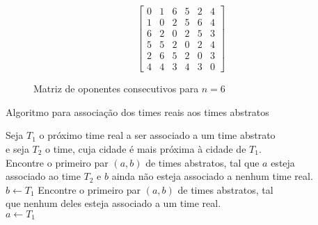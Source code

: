 \documentclass[12pt,a4paper]{article}
\makeatletter
\newcommand{\algorithmfootnote}[2][\footnotesize]{%
	\let\old@algocf@finish\@algocf@finish%
	\def\@algocf@finish{\old@algocf@finish%
		\leavevmode\rlap{\begin{minipage}{\linewidth}
				#1#2
		\end{minipage}}%
	}%
}
\makeatother
\begin{document}
\begin{figure}[H]
	\caption{Matriz de oponentes consecutivos para $n=6$}
	\label{matriz:consecutivos}
	\[ \begin{bmatrix}
	0 & 1 & 6 & 5 & 2 & 4 \\
	1 & 0 & 2 & 5 & 6 & 4 \\
	6 & 2 & 0 & 2 & 5 & 3 \\
	5 & 5 & 2 & 0 & 2 & 4 \\
	2 & 6 & 5 & 2 & 0 & 3 \\
	4 & 4 & 3 & 4 & 3 & 0
	\end{bmatrix} \]
\end{figure}



\begin{algorithm}
	\caption{Algoritmo para associação dos times reais aos times abstratos}
	\algorithmfootnote{Fonte: \Citeauthor{marcio:jogos} \Citep{marcio:jogos}}
	\label{associa}
	 {
		Seja $T_{1}$ o próximo time real a ser associado a um time abstrato\\
		e seja $T_{2}$ o time, cuja cidade é mais próxima à cidade de $T_{1}$.\\
		 {
			Encontre o primeiro par $(a,b)$ de times abstratos, tal que $a$ esteja\\
			associado ao time $T_{2}$ e $b$ ainda não esteja associado a nenhum time real.\\
			$b \leftarrow T_{1}$ }
			{ Encontre o primeiro par $(a,b)$ de times abstratos, tal\\
			que nenhum deles esteja associado a um time real.\\
			$a \leftarrow T_{1}$ } }
\end{algorithm}
\end{document}
